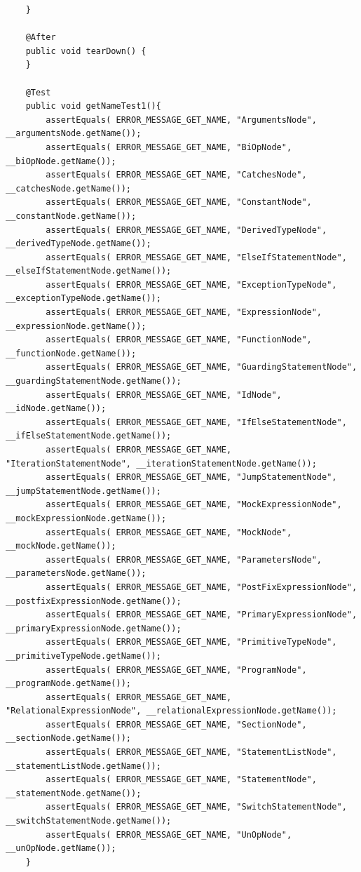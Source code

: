 \documentclass{report}
\begin{document}
\begin{verbatim}
	}

	@After
	public void tearDown() {
	}

	@Test
	public void getNameTest1(){
		assertEquals( ERROR_MESSAGE_GET_NAME, "ArgumentsNode", __argumentsNode.getName());
		assertEquals( ERROR_MESSAGE_GET_NAME, "BiOpNode", __biOpNode.getName());
		assertEquals( ERROR_MESSAGE_GET_NAME, "CatchesNode", __catchesNode.getName());
		assertEquals( ERROR_MESSAGE_GET_NAME, "ConstantNode", __constantNode.getName());
		assertEquals( ERROR_MESSAGE_GET_NAME, "DerivedTypeNode", __derivedTypeNode.getName());
		assertEquals( ERROR_MESSAGE_GET_NAME, "ElseIfStatementNode", __elseIfStatementNode.getName());
		assertEquals( ERROR_MESSAGE_GET_NAME, "ExceptionTypeNode", __exceptionTypeNode.getName());
		assertEquals( ERROR_MESSAGE_GET_NAME, "ExpressionNode", __expressionNode.getName());
		assertEquals( ERROR_MESSAGE_GET_NAME, "FunctionNode", __functionNode.getName());
		assertEquals( ERROR_MESSAGE_GET_NAME, "GuardingStatementNode", __guardingStatementNode.getName());
		assertEquals( ERROR_MESSAGE_GET_NAME, "IdNode", __idNode.getName());
		assertEquals( ERROR_MESSAGE_GET_NAME, "IfElseStatementNode", __ifElseStatementNode.getName());
		assertEquals( ERROR_MESSAGE_GET_NAME, "IterationStatementNode", __iterationStatementNode.getName());
		assertEquals( ERROR_MESSAGE_GET_NAME, "JumpStatementNode", __jumpStatementNode.getName());
		assertEquals( ERROR_MESSAGE_GET_NAME, "MockExpressionNode", __mockExpressionNode.getName());
		assertEquals( ERROR_MESSAGE_GET_NAME, "MockNode", __mockNode.getName());
		assertEquals( ERROR_MESSAGE_GET_NAME, "ParametersNode", __parametersNode.getName());
		assertEquals( ERROR_MESSAGE_GET_NAME, "PostFixExpressionNode", __postfixExpressionNode.getName());
		assertEquals( ERROR_MESSAGE_GET_NAME, "PrimaryExpressionNode", __primaryExpressionNode.getName());
		assertEquals( ERROR_MESSAGE_GET_NAME, "PrimitiveTypeNode", __primitiveTypeNode.getName());
		assertEquals( ERROR_MESSAGE_GET_NAME, "ProgramNode", __programNode.getName());
		assertEquals( ERROR_MESSAGE_GET_NAME, "RelationalExpressionNode", __relationalExpressionNode.getName());
		assertEquals( ERROR_MESSAGE_GET_NAME, "SectionNode", __sectionNode.getName());
		assertEquals( ERROR_MESSAGE_GET_NAME, "StatementListNode", __statementListNode.getName());
		assertEquals( ERROR_MESSAGE_GET_NAME, "StatementNode", __statementNode.getName());
		assertEquals( ERROR_MESSAGE_GET_NAME, "SwitchStatementNode", __switchStatementNode.getName());
		assertEquals( ERROR_MESSAGE_GET_NAME, "UnOpNode", __unOpNode.getName());		
	}
	

\end{verbatim}
\end{document}
